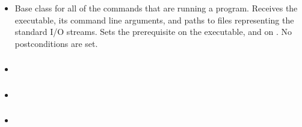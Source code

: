 \subsubsection*{}\label{subsec:Run}

\begin{itemize}[label={}]
    \item Base class for all of the commands that are running a program.
          Receives the executable, its command line arguments, and paths to files representing the standard I/O streams.
          Sets the \hyperref[subsec:ProgramExistsPrerequisite]{} prerequisite on the
          executable, and \hyperref[subsec:FileExistsPrerequisite]{} on .
          No postconditions are set.
\end{itemize}

\subsubsection*{}\label{subsec:RunSolution}

\begin{itemize}[label={}]
    \item
\end{itemize}

\subsubsection*{}\label{subsec:RunCSharp}

\begin{itemize}[label={}]
    \item
\end{itemize}

\subsubsection*{}\label{subsec:RunPSQL}

\begin{itemize}[label={}]
    \item
\end{itemize}

\subsubsection*{}\label{subsec:RunJavaClass}

